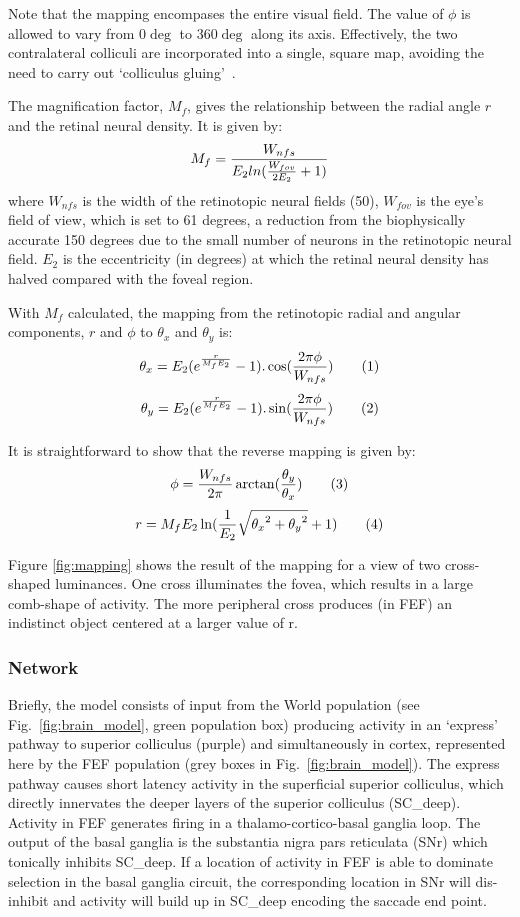 \documentclass{frontiersSCNS}
\begin{document}
Note that the mapping encompases the entire visual field. The value of
$\phi$ is allowed to vary from 0$\deg$ to 360$\deg$ along its axis.
Effectively, the two contralateral colliculi are incorporated into a
single, square map, avoiding the need to carry out `colliculus
gluing'~\cite{tabareau_geometry_2007}.

The magnification factor, $M_f$, gives the relationship between the
radial angle $r$ and the retinal neural density. It is given by:
\[ \label{eq:mf}
   M_f = {W_{nfs} \over E_2 ln ({W_{fov} \over 2 E_2} + 1)}
\]
where $W_{nfs}$ is the width of the retinotopic neural fields (50),
$W_{fov}$ is the eye's field of view, which is set to 61 degrees, a
reduction from the biophysically accurate 150 degrees due to the small
number of neurons in the retinotopic neural field. $E_2$ is the
eccentricity (in degrees) at which the retinal neural density has
halved compared with the foveal region.

With $M_f$ calculated, the mapping from the retinotopic radial and
angular components, $r$ and $\phi$ to $\theta_x$ and $\theta_y$ is:
\[
   \theta_x = E_2 (e^{{r \over M_f E_2}} - 1).\cos({2 \pi \phi \over
   W_{nfs}}) \tag{1}
\]
\[
   \theta_y = E_2 (e^{{r \over M_f E_2}} - 1).\sin({2 \pi \phi \over W_{nfs}}) \tag{2}
\]

It is straightforward to show that the reverse mapping is given by:
\[
   \phi = {W_{nfs} \over 2 \pi}\arctan({\theta_y\over\theta_x}) \tag{3}
\]
\[
   r = M_f E_2 \ln ({1\over E_2}\sqrt{{\theta_x}^2 + {\theta_y}^2}+1) \tag{4}
\]

Figure \ref{fig:mapping} shows the result of the mapping for a view of
two cross-shaped luminances. One cross illuminates the fovea, which
results in a large comb-shape of activity. The more peripheral cross
produces (in FEF) an indistinct object centered at a larger value of
r.

\subsubsection{Network}

Briefly, the model consists of input from the World population (see
Fig.~\ref{fig:brain_model}, green population box) producing activity
in an `express' pathway to superior colliculus (purple) and
simultaneously in cortex, represented here by the FEF population (grey
boxes in Fig.~\ref{fig:brain_model}). The express pathway causes short
latency activity in the superficial superior colliculus, which
directly innervates the deeper layers of the superior colliculus
(SC\_deep). Activity in FEF generates firing in a
thalamo-cortico-basal ganglia loop. The output of the basal ganglia is
the substantia nigra pars reticulata (SNr) which tonically inhibits
SC\_deep. If a location of activity in FEF is able to dominate
selection in the basal ganglia circuit, the corresponding location in
SNr will dis-inhibit and activity will build up in SC\_deep encoding
the saccade end point.
\end{document}
